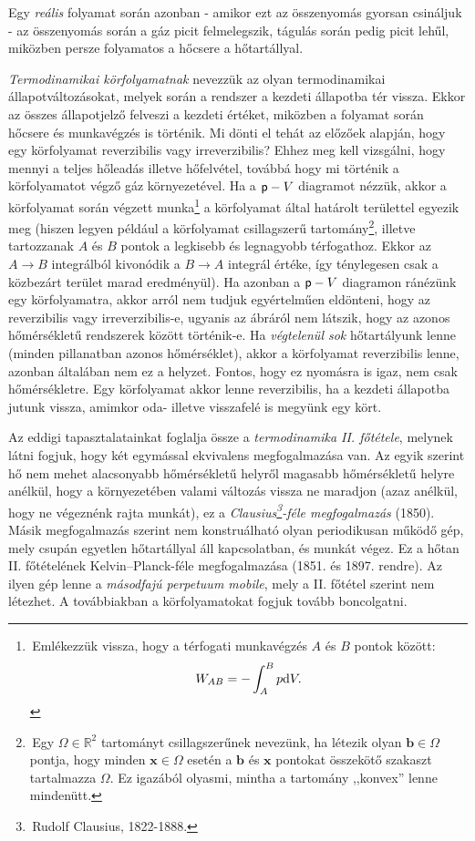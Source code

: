 Egy \emph{reális} folyamat során azonban - amikor ezt az összenyomás gyorsan csináljuk - az összenyomás során a gáz picit felmelegszik, tágulás során pedig picit lehűl, miközben persze folyamatos a hőcsere a hőtartállyal.

\emph{Termodinamikai körfolyamatnak} nevezzük az olyan termodinamikai állapotváltozásokat, melyek során a rendszer a kezdeti állapotba tér vissza. Ekkor az összes állapotjelző felveszi a kezdeti értéket, miközben a folyamat során hőcsere és munkavégzés is történik. Mi dönti el tehát az előzőek alapján, hogy egy körfolyamat reverzibilis vagy irreverzibilis? Ehhez meg kell vizsgálni, hogy mennyi a teljes hőleadás illetve hőfelvétel, továbbá hogy mi történik a körfolyamatot végző gáz környezetével. Ha a $\mathsf p-V$ diagramot nézzük, akkor a körfolyamat során végzett munka\footnote{\,Emlékezzük vissza, hogy a térfogati munkavégzés $A$ és $B$ pontok között:$$W_{AB} = -\int_A^B p\mathrm{d}V.$$} a körfolyamat által határolt területtel egyezik meg (hiszen legyen például a körfolyamat csillagszerű tartomány\footnote{\,Egy $\Omega\in\mathbb R^2$ tartományt csillagszerűnek nevezünk, ha létezik olyan $\bm b\in\Omega$ pontja, hogy minden $\bm x \in\Omega$ esetén a $\bm b$ és $\bm x$ pontokat összekötő szakaszt tartalmazza $\Omega$. Ez igazából olyasmi, mintha a tartomány ,,konvex'' lenne mindenütt.}, illetve tartozzanak $A$ és $B$ pontok a legkisebb és legnagyobb térfogathoz. Ekkor az $A\to B$ integrálból kivonódik a $B\to A$ integrál értéke, így ténylegesen csak a közbezárt terület marad eredményül). Ha azonban a $\mathsf p-V$ diagramon ránézünk egy körfolyamatra, akkor arról nem tudjuk egyértelműen eldönteni, hogy az reverzibilis vagy irreverzibilis-e, ugyanis az ábráról nem látszik, hogy az azonos hőmérsékletű rendszerek között történik-e. Ha \emph{végtelenül sok} hőtartályunk lenne (minden pillanatban azonos hőmérséklet), akkor a körfolyamat reverzibilis lenne, azonban általában nem ez a helyzet. Fontos, hogy ez nyomásra is igaz, nem csak hőmérsékletre. Egy körfolyamat akkor lenne reverzibilis, ha a kezdeti állapotba jutunk vissza, amimkor oda- illetve visszafelé is megyünk egy kört.

Az eddigi tapasztalatainkat foglalja össze a \emph{termodinamika II. főtétele}, melynek látni fogjuk, hogy két egymással ekvivalens megfogalmazása van. Az egyik szerint hő nem mehet alacsonyabb hőmérsékletű helyről magasabb hőmérsékletű helyre anélkül, hogy a környezetében valami változás vissza ne maradjon (azaz anélkül, hogy ne végeznénk rajta munkát), ez a \emph{Clausius\footnote{\,Rudolf Clausius, 1822-1888.}-féle megfogalmazás} (1850). Másik megfogalmazás szerint nem konstruálható olyan periodikusan működő gép, mely csupán egyetlen hőtartállyal áll kapcsolatban, és munkát végez. Ez a hőtan II. főtételének Kelvin--Planck-féle megfogalmazása (1851. és 1897. rendre). Az ilyen gép lenne a \emph{másodfajú perpetuum mobile}, mely a II. főtétel szerint nem létezhet. A továbbiakban a körfolyamatokat fogjuk tovább boncolgatni.